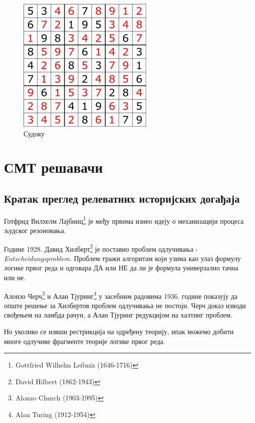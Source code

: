 \documentclass[a4paper]{article}
\begin{document}
\begin{figure}[h!]
    \begin{center}
        \includegraphics[scale=0.4]{./slike/sudoku.png}
    \end{center}
    \caption{Судоку}
    \label{fig:sudoku}
\end{figure}

\section{СМТ решавачи}
\label{sec:smtSolver}
\subsection{Кратак преглед релеватних историјских догађаја}
Готфрид Вилхелм Лајбниц\footnote{Gottfried Wilhelm Leibniz (1646-1716)} је међу првима изнео идеју
о механизацији процеса људског резоновања.

Године 1928. Давид Хилберт\footnote{David Hilbert (1862-1943)} је поставио проблем одлучивања - \emph{Entscheidungsproblem}.
Проблем тражи алгоритам који узима као улаз формулу логике првог реда и одговара ДА или НЕ да ли је формула универзално
тачна или не.

Алонзо Черч\footnote{Alonzo Church (1903-1995)} и Алан Тјуринг\footnote{Alan Turing (1912-1954)} у засебним радовима 1936. године показују да опште решење за Хилбертов проблем одлучивања
не постоји. Черч доказ изводи свођењем на ламбда рачун, а Алан Тјуринг редукцијом на халтинг проблем.

Но уколико се извши рестрикција на одређену теорију, ипак можемо добити многе одлучиве фрагменте теорије логике
првог реда.
\end{document}
